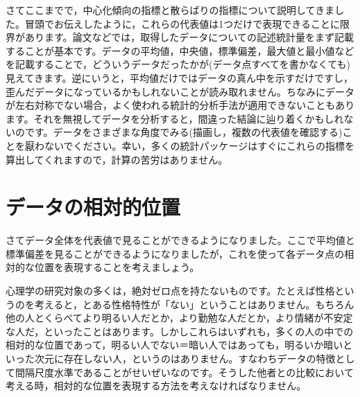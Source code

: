 \documentclass{ltjbook}
\begin{document}
さてここまでで，中心化傾向の指標と散らばりの指標について説明してきました。冒頭でお伝えしたように，これらの代表値は1つだけで表現できることに限界があります。論文などでは，取得したデータについての記述統計量をまず記載することが基本です。データの平均値，中央値，標準偏差，最大値と最小値などを記載することで，どういうデータだったかが(データ点すべてを書かなくても)見えてきます。逆にいうと，平均値だけではデータの真ん中を示すだけですし，歪んだデータになっているかもしれないことが読み取れません。ちなみにデータが左右対称でない場合，よく使われる統計的分析手法が適用できないこともあります。それを無視してデータを分析すると，間違った結論に辿り着くかもしれないのです。データをさまざまな角度でみる(描画し，複数の代表値を確認する)ことを厭わないでください。幸い，多くの統計パッケージはすぐにこれらの指標を算出してくれますので，計算の苦労はありません。

\section{データの相対的位置}
\label{zScore}
さてデータ全体を代表値で見ることができるようになりました。ここで平均値と標準偏差を見ることができるようになりましたが，これを使って各データ点の相対的な位置を表現することを考えましょう。

心理学の研究対象の多くは，絶対ゼロ点を持たないものです。たとえば性格というのを考えると，とある性格特性が「ない」ということはありません。もちろん他の人とくらべてより明るい人だとか，より勤勉な人だとか，より情緒が不安定な人だ，といったことはあります。しかしこれらはいずれも，多くの人の中での相対的な位置であって，明るい人でない＝暗い人ではあっても，明るいか暗いといった次元に存在しない人，というのはありません。すなわちデータの特徴として間隔尺度水準であることがせいぜいなのです。そうした他者との比較において考える時，相対的な位置を表現する方法を考えなければなりません。
\end{document}
